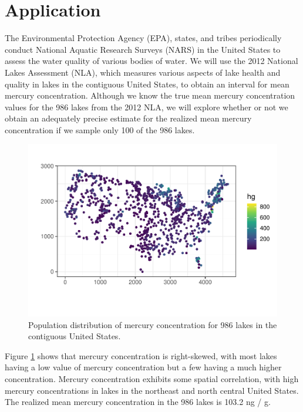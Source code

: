 \documentclass[]{elsarticle} %
\begin{document}
\hypertarget{application}{%
\section{Application}\label{application}}

The Environmental Protection Agency (EPA), states, and tribes
periodically conduct National Aquatic Research Surveys (NARS) in the
United States to assess the water quality of various bodies of water. We
will use the 2012 National Lakes Assessment (NLA), which measures
various aspects of lake health and quality in lakes in the contiguous
United States, to obtain an interval for mean mercury concentration.
Although we know the true mean mercury concentration values for the 986
lakes from the 2012 NLA, we will explore whether or not we obtain an
adequately precise estimate for the realized mean mercury concentration
if we sample only 100 of the 986 lakes.

\begin{figure}
\includegraphics[width=1\linewidth]{manuscript_files/figure-latex/figdata-1} \caption{Population distribution of mercury concentration for 986 lakes in the contiguous United States.}\label{fig:figdata}
\end{figure}

Figure \ref{fig:figdata} shows that mercury concentration is
right-skewed, with most lakes having a low value of mercury
concentration but a few having a much higher concentration. Mercury
concentration exhibits some spatial correlation, with high mercury
concentrations in lakes in the northeast and north central United
States. The realized mean mercury concentration in the 986 lakes is
103.2 ng / g.
\end{document}
